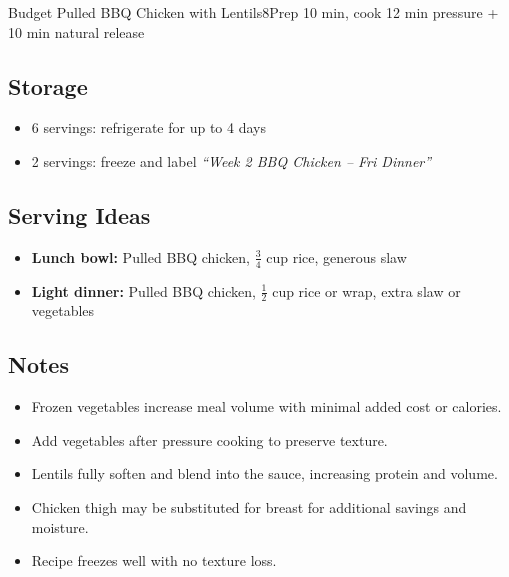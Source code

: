 \begin{recipebox}{Budget Pulled BBQ Chicken with Lentils}{8}{Prep 10 min, cook 12 min pressure + 10 min natural release}
\subsection*{Storage}
\begin{itemize}
    \item 6 servings: refrigerate for up to 4 days
    \item 2 servings: freeze and label \emph{``Week 2 BBQ Chicken -- Fri Dinner''}
\end{itemize}

\subsection*{Serving Ideas}
\begin{itemize}
    \item \textbf{Lunch bowl:} Pulled BBQ chicken, $\tfrac{3}{4}$ cup rice, generous slaw
    \item \textbf{Light dinner:} Pulled BBQ chicken, $\tfrac{1}{2}$ cup rice or wrap, extra slaw or vegetables
\end{itemize}

\subsection*{Notes}
\begin{itemize}
    \item Frozen vegetables increase meal volume with minimal added cost or calories.
    \item Add vegetables after pressure cooking to preserve texture.
    \item Lentils fully soften and blend into the sauce, increasing protein and volume.
    \item Chicken thigh may be substituted for breast for additional savings and moisture.
    \item Recipe freezes well with no texture loss.
\end{itemize}
\end{recipebox}
